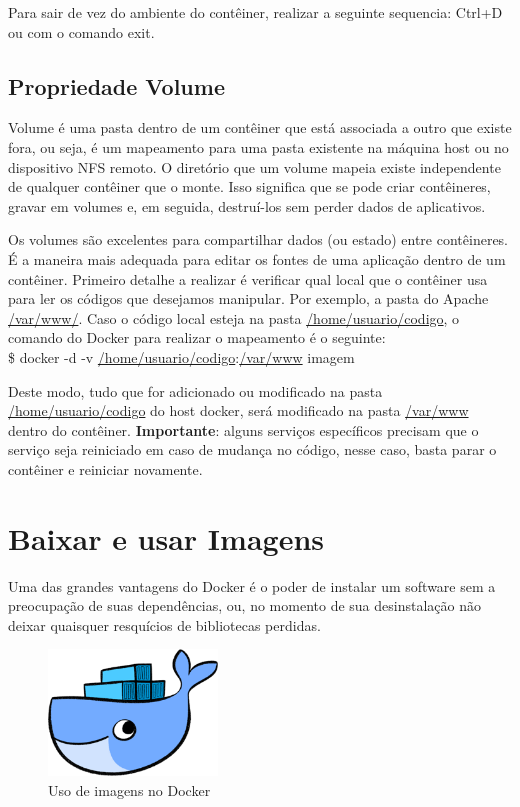 \documentclass[a4paper,11pt]{article}
\begin{document}
Para sair de vez do ambiente do contêiner, realizar a seguinte sequencia: 
{\ttfamily Ctrl+D} ou com o comando {\ttfamily exit}.

\subsection{Propriedade Volume}
Volume é uma pasta dentro de um contêiner que está associada a outro que existe fora, ou seja, é um mapeamento para uma pasta existente na máquina host ou no dispositivo NFS remoto. O diretório que um volume mapeia existe independente de qualquer contêiner que o monte. Isso significa que se pode criar contêineres, gravar em volumes e, em seguida, destruí-los sem perder dados de aplicativos.

Os volumes são excelentes para compartilhar dados (ou estado) entre contêineres. É a maneira mais adequada para editar os fontes de uma aplicação dentro de um contêiner. Primeiro detalhe a realizar é verificar qual local que o contêiner usa para ler os códigos que desejamos manipular. Por exemplo, a pasta do Apache \url{/var/www/}. Caso o código local esteja na pasta \url{/home/usuario/codigo}, o comando do Docker para realizar o mapeamento é o seguinte: \\
{\ttfamily\$ docker -d -v \url{/home/usuario/codigo}:\url{/var/www} imagem}

Deste modo, tudo que for adicionado ou modificado na pasta \url{/home/usuario/codigo} do host docker, será modificado na pasta \url{/var/www} dentro do contêiner. \textbf{Importante}: alguns serviços específicos precisam que o serviço seja reiniciado em caso de mudança no código, nesse caso, basta parar o contêiner e reiniciar novamente.

\section{Baixar e usar Imagens}
Uma das grandes vantagens do Docker é o poder de instalar um software sem a preocupação de suas dependências, ou, no momento de sua desinstalação não deixar quaisquer resquícios de bibliotecas perdidas.
\begin{figure}[H]
	\centering
	\includegraphics[width=0.4\textwidth]{imagem/whale-docker-logo.png}
	\caption{Uso de imagens no Docker}
\end{figure}
\end{document}
